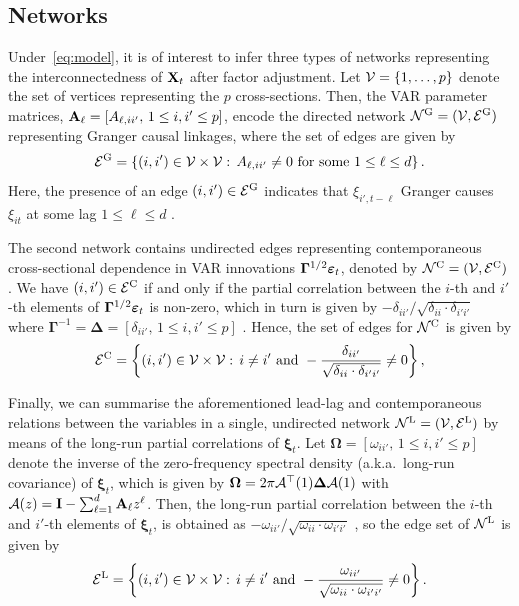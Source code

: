 \subsection{Networks}
\label{sec:networks}

Under~\eqref{eq:model}, it is of interest to infer three types of networks representing the interconnectedness of $\mathbf X_t$ after factor adjustment. 
Let $\mathcal V = \{1, \ldots, p\}$ denote the set of vertices representing the $p$ cross-sections.
Then, the VAR parameter matrices, $\mathbf A_\ell = [A_{\ell, ii'}, \, 1 \le i, i' \le p]$, encode the directed network $\mathcal N^{\text{\upshape{G}}} = (\mathcal V, \mathcal E^{\text{\upshape{G}}})$ representing Granger causal linkages, where the set of edges are given by
\begin{align}
\label{eq:net:dir}
\mathcal E^{\text{\upshape{G}}} = \left\{(i, i') \in \mathcal V \times \mathcal V: \, A_{\ell, ii'} \ne 0 \text{ for some } 1 \le \ell \le d \right\}.
\end{align}
Here, the presence of an edge $(i, i') \in \mathcal E^{\text{\upshape{G}}}$ indicates that $\xi_{i', t - \ell}$ Granger causes $\xi_{it}$ at some lag $1 \le \ell \le d$ \citep{dahlhaus2000graphical}.

The second network contains undirected edges representing contemporaneous cross-sectional dependence in VAR innovations $\bm\Gamma^{1/2} \bm{\varepsilon}_t$, denoted by $\mathcal N^{\text{\upshape{C}}} = (\mathcal V, \mathcal E^{\text{\upshape{C}}})$.
We have $(i, i') \in \mathcal E^{\text{\upshape{C}}}$ if and only if the partial correlation between the $i$-th and $i'$-th elements of $\bm\Gamma^{1/2} \bm{\varepsilon}_t$ is non-zero, which in turn is given by $- \delta_{ii'}/\sqrt{\delta_{ii} \cdot \delta_{i'i'}}$ where $\bm\Gamma^{-1} = \bm\Delta = [\delta_{ii'}, \, 1 \le i, i' \le p]$ \citep{peng2009partial}.
Hence, the set of edges for $\mathcal N^{\text{\upshape{C}}}$ is given by
\begin{align}
\label{eq:net:undir}
\mathcal E^{\text{\upshape{C}}} = \left\{ (i, i') \in \mathcal V \times \mathcal V: \, i \ne i' \text{ and }
- \frac{\delta_{ii'}}{\sqrt{\delta_{ii} \cdot \delta_{i'i'}}} \ne 0 \right\},
\end{align}

Finally, we can summarise the aforementioned lead-lag and contemporaneous relations between the variables in a single, undirected network $\mathcal N^{\text{\upshape{L}}} = (\mathcal V, \mathcal E^{\text{\upshape{L}}})$ by means of the long-run partial correlations of $\bm\xi_t$. 
Let $\bm\Omega = [\omega_{ii'}, \, 1 \le i, i' \le p]$ denote the inverse of the zero-frequency spectral density (a.k.a.\ long-run covariance) of $\bm\xi_t$, which is given by $\bm \Omega = 2\pi \mathcal A^\top(1) \bm\Delta \mathcal A(1)$ with $\mathcal A(z) = \mathbf I - \sum_{\ell = 1}^{d} \mathbf A_\ell z^\ell$.
Then, the long-run partial correlation between the $i$-th and $i'$-th elements of $\bm\xi_t$, is obtained as $- \omega_{ii'}/\sqrt{\omega_{ii} \cdot \omega_{i'i'}}$ \citep{dahlhaus2000graphical}, so the edge set of $\mathcal N^{\text{\upshape{L}}}$ is given by
\begin{align}
\label{eq:net:lr}
\mathcal E^{\text{\upshape{L}}} = \left\{ (i, i') \in \mathcal V \times \mathcal V: \, i \ne i' \text{ and }
- \frac{\omega_{ii'}}{\sqrt{\omega_{ii} \cdot \omega_{i'i'}}} \ne 0 \right\}.
\end{align}
